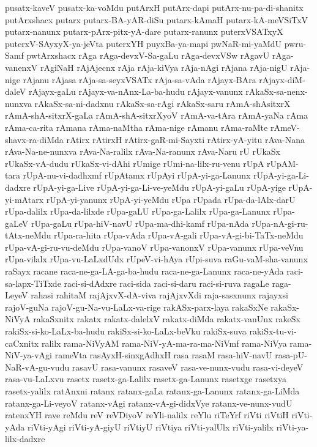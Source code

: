 {pusatx-kaveV
pusatx-ka-voMdu
putArxH
putArx-dapi
putArx-nu-pa-di-shanitx
putArxshacx
putarx
putarx-BA-yAR-diSu
putarx-kAmaH
putarx-kA-meVSiTxV
putarx-nanunx
putarx-pArx-pitx-yA-dare
putarx-ranunx
puterxVSATxyX
puterxV-SAyxyX-ya-jeVta
puterxYH
puyxBa-ya-mapi
pwNaR-mi-yaMdU
pwru-Samf
pwtArxshacx
rAga
rAga-devxV-Sa-gaLu
rAga-devxVSw
rAgavU
rAga-vanenxV
rAgiNaH
rAjAjecnx
rAja
rAja-kiVya
rAja-nAgi
rAjana
rAja-nigU
rAja-nige
rAjanu
rAjasa
rAja-sa-seyxVSATx
rAja-sa-vAda
rAjayx-BAra
rAjayx-diM-daleV
rAjayx-gaLu
rAjayx-va-nAnx-La-ba-hudu
rAjayx-vanunx
rAkaSx-sa-nenx-nunxva
rAkaSx-sa-ni-dadxnu
rAkaSx-sa-rAgi
rAkaSx-saru
rAmA-shAsitxrX
rAmA-shA-sitxrX-gaLa
rAmA-shA-sitxrXyoV
rAmA-va-tAra
rAmA-yaNa
rAma
rAma-ca-rita
rAmana
rAma-naMtha
rAma-nige
rAmanu
rAma-raMte
rAmeV-shavx-ra-diMda
rAtirx
rAtirxH
rAtirx-gaR-mi-Sayxti
rAtirx-yA-yitu
rAva-Nana
rAva-Na-ne-nunxva
rAva-Na-ralilx
rAva-Na-ranunx
rAva-Naru
rU
rUkaSx
rUkaSx-vA-dudu
rUkaSx-vi-dAhi
rUmige
rUmi-na-lilx-ru-venu
rUpA
rUpAM-tara
rUpA-nu-vi-dadhxmf
rUpAtamx
rUpAyi
rUpA-yi-ga-Lanunx
rUpA-yi-ga-Li-dadxre
rUpA-yi-ga-Live
rUpA-yi-ga-Li-ve-yeMdu
rUpA-yi-gaLu
rUpA-yige
rUpA-yi-mAtarx
rUpA-yi-yanunx
rUpA-yi-yeMdu
rUpa
rUpada
rUpa-da-lAlx-darU
rUpa-dalilx
rUpa-da-lilxde
rUpa-gaLU
rUpa-ga-Lalilx
rUpa-ga-Lanunx
rUpa-gaLeV
rUpa-gaLu
rUpa-hiV-navU
rUpa-ma-dhi-kamf
rUpa-nAda
rUpa-nA-gi-ru-tAtx-neMdu
rUpa-ra-hita
rUpa-vAda
rUpa-vA-gali
rUpa-vA-gi-bi-TaTx-neMdu
rUpa-vA-gi-ru-vu-deMdu
rUpa-vanoV
rUpa-vanonxV
rUpa-vanunx
rUpa-veVnu
rUpa-vilalx
rUpa-vu-LaLxdUdx
rUpeV-vi-hAya
rUpi-suva
raGu-vaM-sha-vanunx
raSayx
racane
raca-ne-ga-LA-ga-ba-hudu
raca-ne-ga-Lanunx
raca-ne-yAda
raci-sa-lapx-TiTxde
raci-si-dAdxre
raci-sida
raci-si-daru
raci-si-ruva
ragaLe
raga-LeyeV
rahasi
rahitaM
rajAjxvX-dA-viva
rajAjxvXdi
raja-sasxnunx
rajayxsi
rajoV-guNa
rajoV-gu-Na-vu-LaLx-va-rige
rakASx-parx-laya
rakaSxNe
rakaSx-NiVyA
rakaSxnitx
rakatx
rakatx-dalelxV
rakatx-diMda
rakatx-vanUnx
rakeSx
rakiSx-si-ko-LaLx-ba-hudu
rakiSx-si-ko-LaLx-beVku
rakiSx-suva
rakiSx-tu-vi-caCxnitx
ralilx
rama-NiVyAM
rama-NiV-yA-ma-ra-ma-NiVmf
rama-NiVya
rama-NiV-ya-vAgi
rameVta
rasAyxH-sinxgAdhxH
rasa
rasaM
rasa-hiV-navU
rasa-pU-NaR-vA-gu-vudu
rasavU
rasa-vanunx
rasaveV
rasa-ve-nunx-vudu
rasa-vi-deyeV
rasa-vu-LaLxvu
rasetx
rasetx-ga-Lalilx
rasetx-ga-Lanunx
rasetxge
rasetxya
rasetx-yalilx
ratAnxni
ratanx
ratanx-gaLa
ratanx-ga-Lanunx
ratanx-ga-LiMda
ratanx-ga-Li-veyoV
ratanx-vAgi
ratanx-vA-gi-didxVye
ratanx-ve-nunx-vudU
ratenxYH
rave
reMdu
reV
reVDiyoV
reYli-nalilx
reYlu
riTeYrf
riVti
riVtiH
riVti-yAda
riVti-yAgi
riVti-yA-giyU
riVtiyU
riVtiya
riVti-yalUlx
riVti-yalilx
riVti-ya-lilx-dadxre
}
